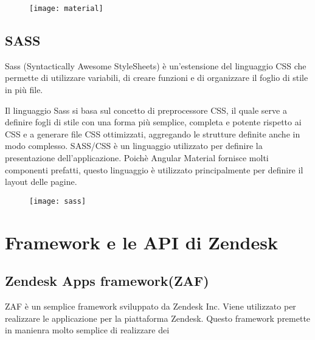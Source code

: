 \begin{figure}[!h] 
	\centering 
	\texttt{[image: material]} 
\end{figure}
\subsection{SASS} Sass (Syntactically Awesome StyleSheets) è un'estensione del linguaggio CSS che permette di utilizzare variabili, di creare funzioni e di organizzare il foglio di stile in più file.

Il linguaggio Sass si basa sul concetto di preprocessore CSS, il quale serve a definire fogli di stile con una forma più semplice, completa e potente rispetto ai CSS e a generare file CSS ottimizzati, aggregando le strutture definite anche in modo complesso. SASS/CSS è un linguaggio utilizzato per definire la presentazione dell'applicazione. Poichè Angular Material fornisce molti componenti prefatti, questo linguaggio è utilizzato principalmente per definire il layout delle pagine. 
\begin{figure}[!h] 
	\centering 
	\texttt{[image: sass]} 
\end{figure}
\section{Framework e le API di Zendesk}

\subsection{Zendesk Apps framework(ZAF)}
ZAF è un semplice framework sviluppato da Zendesk Inc. Viene utilizzato per realizzare le applicazione per la piattaforma Zendesk. Questo framework premette in manienra molto semplice di realizzare dei


